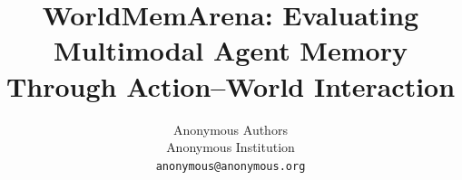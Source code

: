 \documentclass{article}
\title{WorldMemArena: Evaluating Multimodal Agent Memory Through Action–World Interaction}
\author{%
  Anonymous Authors \\
  Anonymous Institution \\
  \texttt{anonymous@anonymous.org} \\
}
\begin{document}
\raggedbottom

\maketitle




\end{document}
